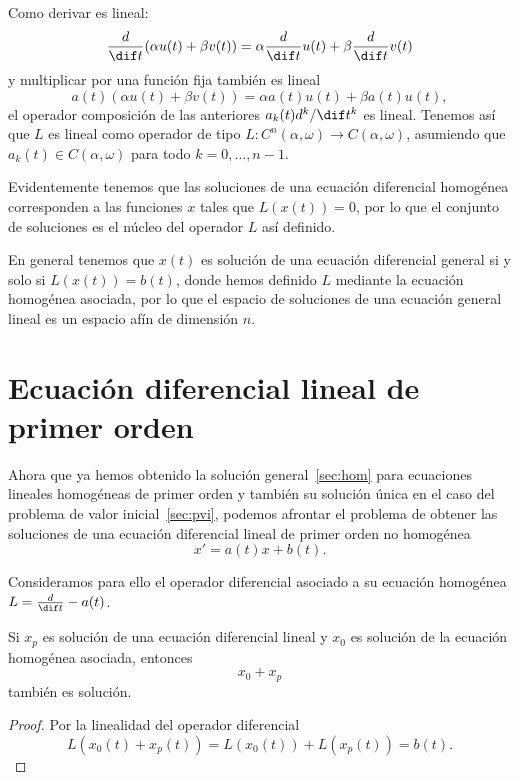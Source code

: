 \documentclass[../ecuaciones_diferenciales.tex]{subfiles}
\begin{document}
Como derivar es lineal:
\[\frac{d}{\dif t} (\alpha u(t) + \beta v(t))
	= \alpha \frac{d}{\dif t} u(t) + \beta \frac{d}{\dif t} v(t)\]
y multiplicar por una función fija también es lineal
\[a(t)(\alpha u(t) + \beta v(t)) = \alpha a(t) u(t) + \beta a(t) u(t),\]
el operador composición de las anteriores \(a_k(t) d^k/\dif t^k\) es
lineal. Tenemos así que \(L\) es lineal como operador de tipo
\(L : C^n(\alpha, \omega) \to C(\alpha, \omega)\), asumiendo que
\(a_k(t) \in C(\alpha, \omega)\) para todo \(k=0, \dots, n-1\).

\begin{remark}
	Evidentemente tenemos que las soluciones de una ecuación diferencial homogénea
	corresponden a las funciones \(x\) tales que \(L(x(t)) = 0\), por lo que el
	conjunto de soluciones es el núcleo del operador \(L\) así definido.
\end{remark}

\begin{remark}
	En general tenemos que \(x(t)\) es solución de una ecuación diferencial
	general si y solo si \(L(x(t)) = b(t)\), donde hemos definido \(L\)
	mediante la ecuación homogénea asociada, por lo que el espacio de
	soluciones de una ecuación general lineal es un espacio afín de dimensión
	\(n\).
\end{remark}

\section{Ecuación diferencial lineal de primer orden}

Ahora que ya hemos obtenido la solución general~\autoref{sec:hom} para
ecuaciones lineales homogéneas de primer orden y también su solución única en el
caso del problema de valor inicial~\autoref{sec:pvi}, podemos afrontar el
problema de obtener las soluciones de una ecuación diferencial lineal de primer
orden no homogénea
\[x' = a(t)x + b(t).\]

Consideramos para ello el operador diferencial asociado a su ecuación homogénea
\(L = \frac{d}{\dif t} - a(t)\).

\begin{lemma}
	Si \(x_p\) es solución de una ecuación diferencial lineal y \(x_0\) es
	solución de la ecuación homogénea asociada, entonces \[x_0 + x_p\] también es
	solución.
\end{lemma}

\begin{proof}
	Por la linealidad del operador diferencial
	\[L(x_0(t) + x_p(t)) = L(x_0(t)) + L(x_p(t)) = b(t).\]
\end{proof}
\end{document}
